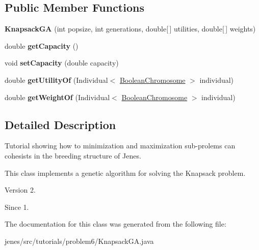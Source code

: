 \subsection*{Public Member Functions}
\begin{DoxyCompactItemize}
\item 
\hypertarget{classjenes_1_1tutorials_1_1problem6_1_1_knapsack_g_a_aa9c826f237b43aa1cd061664c2f81f42}{{\bfseries Knapsack\-G\-A} (int popsize, int generations, double\mbox{[}$\,$\mbox{]} utilities, double\mbox{[}$\,$\mbox{]} weights)}\label{classjenes_1_1tutorials_1_1problem6_1_1_knapsack_g_a_aa9c826f237b43aa1cd061664c2f81f42}

\item 
\hypertarget{classjenes_1_1tutorials_1_1problem6_1_1_knapsack_g_a_aa8e92fd2de8e1168d812074c0ebd19d1}{double {\bfseries get\-Capacity} ()}\label{classjenes_1_1tutorials_1_1problem6_1_1_knapsack_g_a_aa8e92fd2de8e1168d812074c0ebd19d1}

\item 
\hypertarget{classjenes_1_1tutorials_1_1problem6_1_1_knapsack_g_a_a6fd3b4ce9620189f4ef916a3616d7868}{void {\bfseries set\-Capacity} (double capacity)}\label{classjenes_1_1tutorials_1_1problem6_1_1_knapsack_g_a_a6fd3b4ce9620189f4ef916a3616d7868}

\item 
\hypertarget{classjenes_1_1tutorials_1_1problem6_1_1_knapsack_g_a_a77be24cd9e25a9306562826f56113641}{double {\bfseries get\-Utility\-Of} (Individual$<$ \hyperlink{classjenes_1_1chromosome_1_1_boolean_chromosome}{Boolean\-Chromosome} $>$ individual)}\label{classjenes_1_1tutorials_1_1problem6_1_1_knapsack_g_a_a77be24cd9e25a9306562826f56113641}

\item 
\hypertarget{classjenes_1_1tutorials_1_1problem6_1_1_knapsack_g_a_ab3cf2a428b860020788cfbe381ed195f}{double {\bfseries get\-Weight\-Of} (Individual$<$ \hyperlink{classjenes_1_1chromosome_1_1_boolean_chromosome}{Boolean\-Chromosome} $>$ individual)}\label{classjenes_1_1tutorials_1_1problem6_1_1_knapsack_g_a_ab3cf2a428b860020788cfbe381ed195f}

\end{DoxyCompactItemize}


\subsection{Detailed Description}
Tutorial showing how to minimization and maximization sub-\/prolems can cohesists in the breeding structure of Jenes.

This class implements a genetic algorithm for solving the Knapsack problem.

\begin{DoxyVersion}{Version}
2. 
\end{DoxyVersion}
\begin{DoxySince}{Since}
1. 
\end{DoxySince}


The documentation for this class was generated from the following file\-:\begin{DoxyCompactItemize}
\item 
jenes/src/tutorials/problem6/Knapsack\-G\-A.\-java\end{DoxyCompactItemize}

